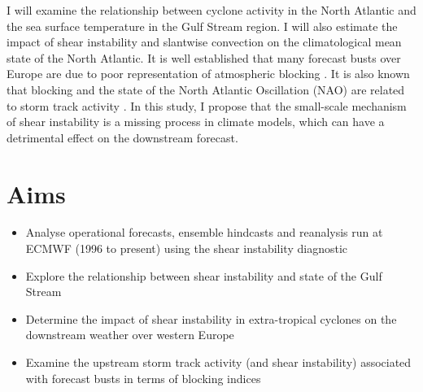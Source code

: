 I will examine the relationship between cyclone activity in the North Atlantic and the sea surface temperature in the Gulf Stream region. I will also estimate the impact of shear instability and slantwise convection on the climatological mean state of the North Atlantic. It is well established that many forecast busts over Europe are due to poor representation of atmospheric blocking \cite{rodwell2013characteristics}. It is also known that blocking and the state of the North Atlantic Oscillation (NAO) are related to storm track activity \citep{vallis2008local}. In this study, I propose that the small-scale mechanism of shear instability is a missing process in climate models, which can have a detrimental effect on the downstream forecast.

%

\section{Aims}
\begin{itemize}
	\item Analyse operational forecasts, ensemble hindcasts and reanalysis run at ECMWF (1996 to present) using the shear instability diagnostic
	\item Explore the relationship between shear instability and state of the Gulf Stream
	\item Determine the impact of shear instability in extra-tropical cyclones on the downstream weather over western Europe
	\item Examine the upstream storm track activity (and shear instability) associated with forecast busts in terms of blocking indices
\end{itemize}


